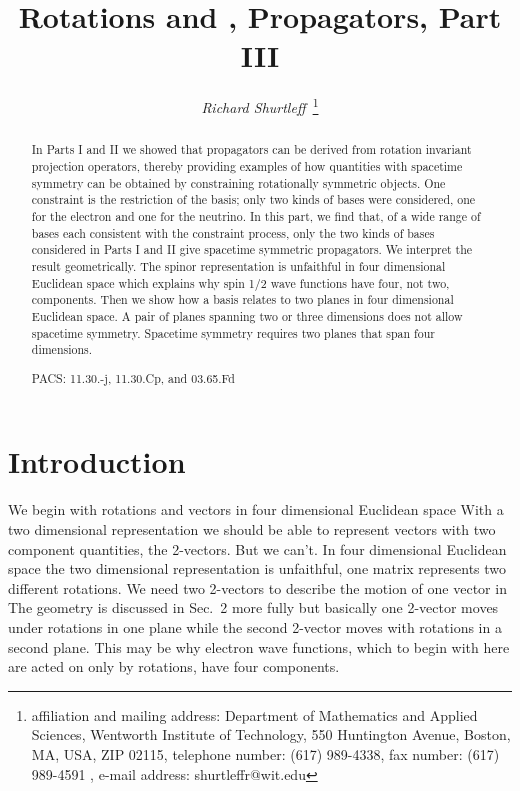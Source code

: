 \documentclass[a4paper,12pt]{article}
\title{ Rotations and \myHighlight{$e$}\coordHE{}, \myHighlight{$\nu$}\coordHE{} Propagators, Part III}
\author{{\it Richard Shurtleff~}\thanks{affiliation and mailing 
address: Department of Mathematics and Applied Sciences, 
Wentworth Institute of Technology, 550 Huntington Avenue, 
Boston, MA, USA, ZIP 02115, telephone number: (617) 989-4338, fax 
number: (617) 989-4591 , e-mail address: shurtleffr@wit.edu}}
\begin{document}
 
          
\maketitle               
			\begin{abstract}  

In Parts I and II we showed that \coordHE{} propagators can be derived from rotation invariant projection operators, thereby providing examples of how quantities with spacetime symmetry can be obtained by constraining rotationally symmetric objects. One constraint is the restriction of the basis; only two kinds of bases were considered, one for the electron and one for the neutrino. In this part, we find that, of a wide range of bases each consistent with the constraint process, only the two kinds of bases considered in Parts I and II give spacetime symmetric propagators. We interpret the result geometrically. The spinor representation is unfaithful in four dimensional Euclidean space which explains why spin 1/2 wave functions have four, not two, components. Then we show how a basis relates to two planes in four dimensional Euclidean space. A pair of planes spanning two or three dimensions does not allow spacetime symmetry. Spacetime symmetry requires two planes that span four dimensions.   

	PACS: 11.30.-j, 11.30.Cp, and 03.65.Fd 
 
		\end{abstract}
\pagebreak

\section{Introduction} \label{intro} %

	We begin with rotations and vectors in four dimensional Euclidean space \coordHE{} With a two dimensional representation we should be able to represent vectors with two component quantities, the 2-vectors. But we can't. In four dimensional Euclidean space the two dimensional representation is unfaithful, one matrix represents two different rotations. We need two 2-vectors to describe the motion of one vector in \coordHE{} The geometry is discussed in Sec.~2 more fully but basically one 2-vector moves under rotations in one plane while the second 2-vector moves with rotations in a second plane. This may be why electron wave functions, which to begin with here are acted on only by rotations, have four components.  
\end{document}
